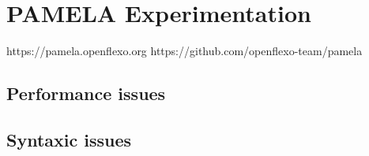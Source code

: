 
\section{PAMELA Experimentation}

https://pamela.openflexo.org
https://github.com/openflexo-team/pamela




\subsection{Performance issues}


\subsection{Syntaxic issues}

